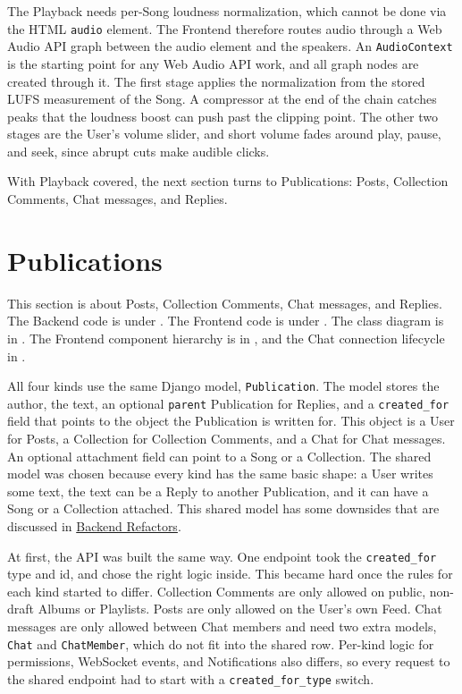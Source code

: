 The Playback needs per-Song loudness normalization, which cannot be
done via the HTML \texttt{audio} element. The Frontend therefore
routes audio through a Web Audio API graph between the audio element
and the speakers. An \texttt{AudioContext} is the starting point for
any Web Audio API work, and all graph nodes are created through it.
The first stage applies the normalization from the stored LUFS
measurement of the Song. A compressor at the end of the chain catches
peaks that the loudness boost can push past the clipping point.
The other two stages are the User's volume slider, and short volume
fades around play, pause, and seek, since abrupt cuts make audible
clicks.

With Playback covered, the next section turns to Publications:
Posts, Collection Comments, Chat messages, and Replies.


\section{Publications}\label{sec:publications}
This section is about Posts, Collection Comments, Chat messages, and Replies.
The Backend code is under .
The Frontend code is under
.
The class diagram is in
.
The Frontend component hierarchy is in
,
and the Chat connection lifecycle in
.

All four kinds use the same Django model, \texttt{Publication}. The
model stores the author, the text, an optional \texttt{parent}
Publication for Replies, and a \texttt{created\_for} field that points
to the object the Publication is written for. This object is a User
for Posts, a Collection for Collection Comments, and a Chat for Chat
messages. An optional attachment field can point to a Song or a
Collection. The shared model was chosen because every kind has the
same basic shape: a User writes some text, the text can be a Reply to
another Publication, and it can have a Song or a Collection attached.
This shared model has some downsides that are discussed in
\hyperref[subsec:imp_be_refactors]{Backend Refactors}.

At first, the API was built the same way. One endpoint took the
\texttt{created\_for} type and id, and chose the right logic inside.
This became hard once the rules for each kind started to differ.
Collection Comments are only allowed on public, non-draft Albums or
Playlists. Posts are only allowed on the User's own Feed. Chat
messages are only allowed between Chat members and need two extra
models, \texttt{Chat} and \texttt{ChatMember}, which do not fit into
the shared row. Per-kind logic for permissions, WebSocket events,
and Notifications also differs, so every request to the shared
endpoint had to start with a \texttt{created\_for\_type} switch.

